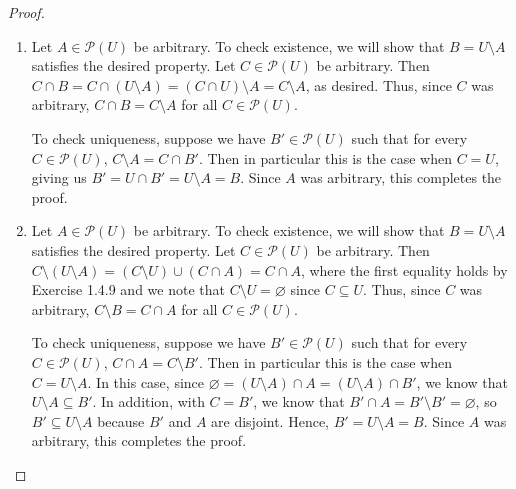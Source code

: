 \documentclass[12pt]{amsart}
\theoremstyle{definition}
\theoremstyle{remark}
\newcommand{\powerset}[1]{\mathscr{P} \left( #1 \right)}
\begin{document}
\begin{proof}
\hfill
\begin{enumerate}
	\item Let $A \in \powerset{U}$ be arbitrary.
	To check existence, we will show that $B = U \setminus A$ satisfies the desired property.
	Let $C \in \powerset{U}$ be arbitrary.
	Then $C \cap B = C \cap (U \setminus A) = (C \cap U) \setminus A = C \setminus A$, as desired.
	Thus, since $C$ was arbitrary, $C \cap B = C \setminus A$ for all $C \in \powerset{U}$.
	
	To check uniqueness, suppose we have $B' \in \powerset{U}$ such that for every 
	$C \in \powerset{U}$, $C \setminus A = C \cap B'$.
	Then in particular this is the case when $C = U$, giving us $B' = U \cap B' = U \setminus A = B$.
	Since $A$ was arbitrary, this completes the proof.
	
	\item Let $A \in \powerset{U}$ be arbitrary.
	To check existence, we will show that $B = U \setminus A$ satisfies the desired property.
	Let $C \in \powerset{U}$ be arbitrary.
	Then $C \setminus (U \setminus A) = (C \setminus U) \cup (C \cap A) = C \cap A$, where the
	first equality holds by Exercise 1.4.9 and we note that $C \setminus U = \varnothing$ since
	$C \subseteq U$.
	Thus, since $C$ was arbitrary, $C \setminus B = C \cap A$ for all $C \in \powerset{U}$.
	
	To check uniqueness, suppose we have $B' \in \powerset{U}$ such that for every
	$C \in \powerset{U}$, $C \cap A = C \setminus B'$.
	Then in particular this is the case when $C = U \setminus A$.
	In this case, since $\varnothing = (U \setminus A) \cap A = (U \setminus A) \cap B'$,
	we know that $U \setminus A \subseteq B'$.
	In addition, with $C = B'$, we know that $B' \cap A = B' \setminus B' = \varnothing$,
	so $B' \subseteq U \setminus A$ because $B'$ and $A$ are disjoint.
	Hence, $B' = U \setminus A = B$.
	Since $A$ was arbitrary, this completes the proof.
\end{enumerate}
\end{proof}
\end{document}
